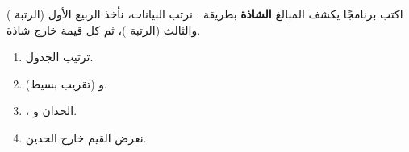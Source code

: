 \begin{statement}
اكتب برنامجًا يكشف المبالغ \textbf{الشاذة} بطريقة \textbf{}: نرتب البيانات، نأخذ الربيع الأول  (الرتبة ) والثالث  (الرتبة )، ثم كل قيمة خارج  شاذة.
\end{statement}
\begin{stepsbox}\begin{enumerate}
\item ترتيب الجدول.
\item {} و (تقريب بسيط).
\item {}، الحدان  و.
\item نعرض القيم خارج الحدين.
\end{enumerate}\end{stepsbox}
